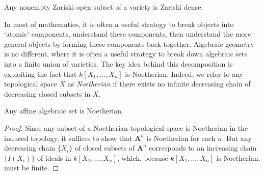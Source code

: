 \begin{corollary}
    Any nonempty Zariski open subset of a variety is Zariski dense.
\end{corollary}

In most of mathematics, it is often a useful strategy to break objects into `atomic' components, understand these components, then understand the more general objects by forming these components back together. Algebraic geometry is no different, where it is often a useful strategy to break down algebraic sets into a finite union of varieties. The key idea behind this decomposition is exploiting the fact that $k[X_1,\dots,X_n]$ is Noetherian. Indeed, we refer to any topological space $X$ as \emph{Noetherian} if there exists no infinite decreasing chain of decreasing closed subsets in $X$.

\begin{lemma}
    Any affine algebraic set is Noetherian.
\end{lemma}
\begin{proof}
    Since any subset of a Noetherian topological space is Noetherian in the induced topology, it suffices to show that $\mathbf{A}^n$ is Noetherian for each $n$. But any decreasing chain $\{ X_i \}$ of closed subsets of $\mathbf{A}^n$ corresponds to an increasing chain $\{ I(X_i) \}$ of ideals in $k[X_1,\dots,X_n]$, which, because $k[X_1,\dots,X_n]$ is Noetherian, must be finite.
\end{proof}


